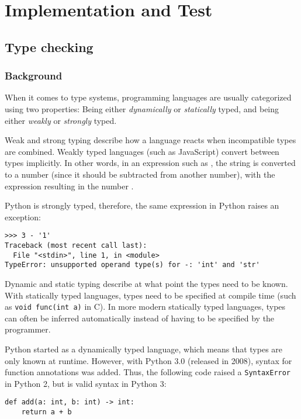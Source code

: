 
\chapter{Implementation and Test}
\label{ch:implementation}

\section{Type checking}
\label{sec:mypy}
\subsection{Background}
When it comes to type systems, programming languages are usually categorized
using two properties: Being either \emph{dynamically} or \emph{statically}
typed, and being either \emph{weakly} or \emph{strongly} typed.

Weak and strong typing describe how a language reacts when incompatible types
are combined. Weakly typed languages (such as JavaScript) convert between types
implicitly. In other words, in an expression such as
, the string  is converted to a number (since it should be
subtracted from another number), with the expression resulting in the number
.

Python is strongly typed, therefore, the same expression in Python raises an
exception:

\begin{verbatim}
>​>​> 3 - '1'
Traceback (most recent call last):
  File "<stdin>", line 1, in <module>
TypeError: unsupported operand type(s) for -: 'int' and 'str'
\end{verbatim}

Dynamic and static typing describe at what point the types need to be known.
With statically typed languages, types need to be specified at compile time
(such as \texttt{void func(int a)} in C). In more modern statically typed
languages, types can often be inferred automatically instead of having to be
specified by the programmer.

Python started as a dynamically typed language, which means that types are only
known at runtime. However, with Python 3.0 (released in 2008), syntax for
function annotations was added. Thus, the following code raised a
\verb|SyntaxError| in Python 2, but is valid syntax in Python 3:

\begin{verbatim}
def add(a: int, b: int) -> int:
    return a + b
\end{verbatim}

